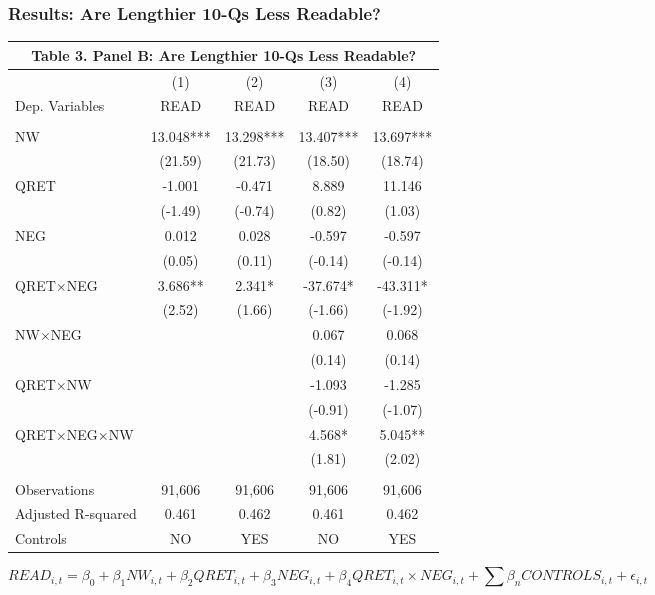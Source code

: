 \documentclass{beamer}
\begin{document}
\begin{frame}
\frametitle{Results: Are Lengthier 10-Qs Less Readable?}

\begin{table}[H] \label{T3PB}
	\begin{center}  \tiny
		\begin{tabular}{lcccc} 
			\multicolumn{5}{c}{\textbf{Table 3. Panel B: Are Lengthier 10-Qs Less Readable?}} \\
			\midrule
			\midrule
			& (1) & (2) & (3) & (4) \\
			Dep. Variables & READ & READ & READ & READ \\
			\midrule
			&   &   &   &  \\
			NW & 13.048*** & 13.298*** & 13.407*** & 13.697*** \\
			& (21.59) & (21.73) & (18.50) & (18.74) \\
			QRET & -1.001 & -0.471 & 8.889 & 11.146 \\
			& (-1.49) & (-0.74) & (0.82) & (1.03) \\
			NEG & 0.012 & 0.028 & -0.597 & -0.597 \\
			& (0.05) & (0.11) & (-0.14) & (-0.14) \\
			
			 QRET$\times$NEG & 3.686** & 2.341* & -37.674* & -43.311* \\
			& (2.52) & (1.66) & (-1.66) & (-1.92) \\
			NW$\times$NEG &   &   & 0.067 & 0.068 \\
			&   &   & (0.14) & (0.14) \\
			QRET$\times$NW &   &   & -1.093 & -1.285 \\
			&   &   & (-0.91) & (-1.07) \\
			
			QRET$\times$NEG$\times$NW &   &   &  4.568* &  5.045** \\
			 &   &   & (1.81) & (2.02) \\
			&   &   &   &  \\
			Observations & 91,606 & 91,606 & 91,606 & 91,606 \\
			Adjusted R-squared & 0.461 & 0.462 & 0.461 & 0.462 \\
			Controls & NO & YES & NO & YES \\
			\bottomrule
			\bottomrule
		\end{tabular}%
	\end{center}
	\begin{footnotesize} \tiny
		\setcounter{equation}{0}
		\begin{equation*}
		READ_{i,t}=\beta_0+\beta_1NW_{i,t}+\beta_2QRET_{i,t}+\beta_3NEG_{i,t}+\beta_4QRET_{i,t}\times NEG_{i,t}+\sum\beta_nCONTROLS_{i,t}+\epsilon_{i,t}
		\end{equation*}
		

	\end{footnotesize}
\end{table}%
\end{frame}
\end{document}
